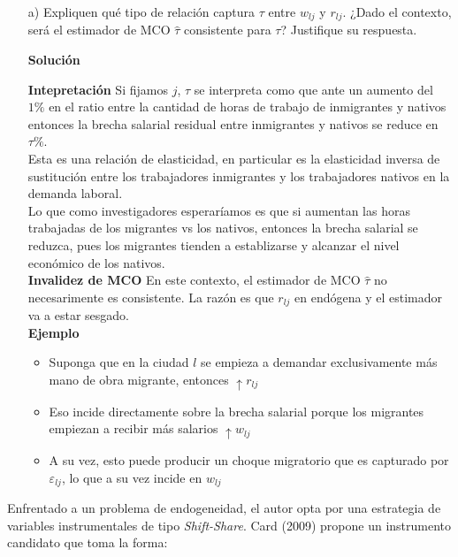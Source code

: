 \documentclass[a4paper, answers, addpoints, 11pt]{exam}
\newenvironment{solucion}{%
  \begin{mdframed}[
    backgroundcolor=blue!5,    %
    linecolor=blue!50,          %
    linewidth=2pt,              %
    leftmargin=10pt,            %
    rightmargin=8pt,           %
    topline=true,              %
    bottomline=true,            %
    roundcorner=10pt,           %
    innerleftmargin=10pt,       %
    innerrightmargin=10pt,      %
    innerbottommargin=10pt,     %
    innertopmargin=10pt         %
  ]%
  \begin{tcolorbox}[colframe=blue!50!black, colback=blue!50, coltitle=white, sharp corners=all, boxrule=1mm, width=\textwidth, halign=left, valign=center, top=0mm, bottom=0mm, left=0mm, right=0mm] \textbf{Solución} \end{tcolorbox} }{\end{mdframed}}
\begin{document}
 
\begin{itemize}

   

    \item[a)] Expliquen qué tipo de relación captura $\tau$ entre $w_{lj}$ y $r_{lj}$. ¿Dado el contexto, será el estimador de MCO $\hat{\tau}$ consistente para $\tau$? Justifique su respuesta.\\
    \begin{solucion}
    \textbf{Intepretación}
Si fijamos $j$, $\tau$ se interpreta como que ante un aumento del $1\%$ en el ratio entre la cantidad de horas de trabajo de inmigrantes y nativos entonces la brecha salarial residual entre inmigrantes y nativos se reduce en $\tau\%$. \\

Esta es una relación de elasticidad, en particular es la elasticidad inversa de sustitución entre los trabajadores inmigrantes y los trabajadores nativos en la demanda laboral. \\

Lo que como investigadores esperaríamos es que si aumentan las horas trabajadas de los migrantes vs los nativos, entonces la brecha salarial se reduzca, pues los migrantes tienden a establizarse y alcanzar el nivel económico de los nativos.\\

 \textbf{Invalidez de MCO}
En este contexto, el estimador de MCO $\hat{\tau}$ no necesarimente es consistente. La razón es que $r_{lj}$ en endógena y el estimador va a estar sesgado.\\ 

\textbf{Ejemplo}
\begin{itemize}
    \item Suponga que en la ciudad $l$ se empieza a demandar exclusivamente más mano de obra migrante, entonces $\uparrow r_{lj}$ 
    \item Eso incide directamente sobre la brecha salarial porque los migrantes empiezan a recibir más salarios $\uparrow w_{lj}$
    \item A su vez, esto puede producir un choque migratorio que es capturado por $\varepsilon_{lj}$, lo que a su vez incide en $w_{lj}$
\end{itemize}
\end{solucion}
\end{itemize}   

Enfrentado a un problema de endogeneidad, el autor opta por una estrategia de variables instrumentales de tipo \textit{Shift-Share}. Card (2009) propone un instrumento candidato que toma la forma:
\end{document}
